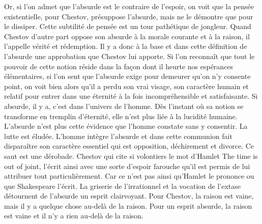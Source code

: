 \documentclass{book}
\begin{document}
Or, si l'on admet que l'absurde est le contraire de l'espoir, on voit que la pensée existentielle, pour Chestov, présuppose l'absurde, mais ne le démontre que pour le dissiper. Cette subtilité de pensée est un tour pathétique de jongleur. Quand Chestov d'autre part oppose son absurde à la morale courante et à la raison, il l'appelle vérité et rédemption. Il y a donc à la base et dans cette définition de l'absurde une approbation que Chestov lui apporte. Si l'on reconnaît que tout le pouvoir de cette notion réside dans la façon dont il heurte nos espérances élémentaires, si l'on sent que l'absurde exige pour demeurer qu'on n'y consente point, on voit bien alors qu'il a perdu son vrai visage, son caractère humain et relatif pour entrer dans une éternité à la fois incompréhensible et satisfaisante. Si absurde, il y a, c'est dans l'univers de l'homme. Dès l'instant où sa notion se transforme en tremplin d'éternité, elle n'est plus liée à la lucidité humaine. L'absurde n'est plus cette évidence que l'homme constate sans y consentir. La lutte est éludée. L'homme intègre l'absurde et dans cette communion fait disparaître son caractère essentiel qui est opposition, déchirement et divorce. Ce saut est une dérobade. Chestov qui cite si volontiers le mot d'Hamlet The time is out of joint, l'écrit ainsi avec une sorte d'espoir farouche qu'il est permis de lui attribuer tout particulièrement. Car ce n'est pas ainsi qu'Hamlet le prononce ou que Shakespeare l'écrit. La griserie de l'irrationnel et la vocation de l'extase détournent de l'absurde un esprit clairvoyant. Pour Chestov, la raison est vaine, mais il y a quelque chose au‑delà de la raison. Pour un esprit absurde, la raison est vaine et il n'y a rien au‑delà de la raison.
\end{document}
